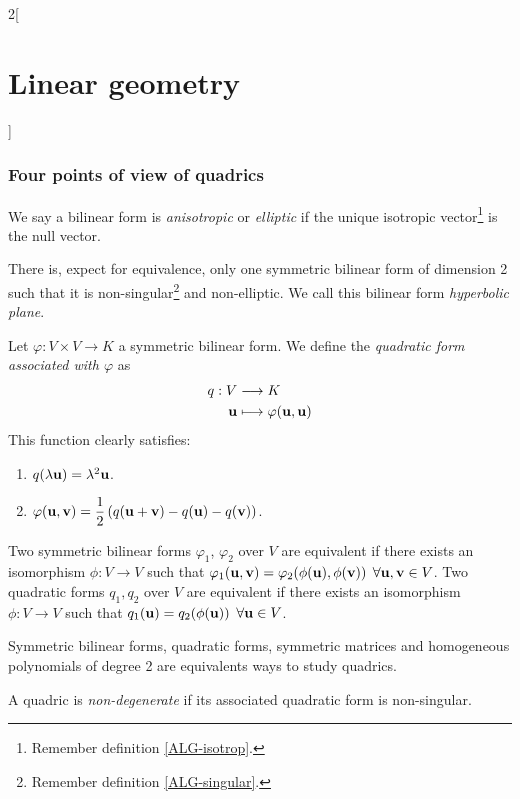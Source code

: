 \documentclass[../../../main.tex]{subfiles}
\begin{document}
\begin{multicols}{2}[\section{Linear geometry}]
    \subsubsection*{Four points of view of quadrics}
    \begin{definition}
        We say a bilinear form is \textit{anisotropic} or \textit{elliptic} if the unique isotropic vector\footnote{Remember definition \ref{ALG-isotrop}.} is the null vector.
    \end{definition}
    \begin{theorem}
        There is, expect for equivalence, only one symmetric bilinear form of dimension 2 such that it is non-singular\footnote{Remember definition \ref{ALG-singular}.} and non-elliptic. We call this bilinear form \textit{hyperbolic plane}.
    \end{theorem}
    \begin{definition}
        Let $\varphi:V\times V\rightarrow K$ a symmetric bilinear form. We define the \textit{quadratic form associated with $\varphi$} as
        \begin{align*}
            q:V                & \longrightarrow K                                         \\
            \boldsymbol{\mathrm{u}} & \longmapsto\varphi(\boldsymbol{\mathrm{u}},\boldsymbol{\mathrm{u}})
        \end{align*} This function clearly satisfies:
        \begin{enumerate}
            \item $q(\lambda\boldsymbol{\mathrm{u}})=\lambda^2\boldsymbol{\mathrm{u}}$.
            \item $\displaystyle\varphi(\boldsymbol{\mathrm{u}},\boldsymbol{\mathrm{v}})=\frac{1}{2}\left(q(\boldsymbol{\mathrm{u}}+\boldsymbol{\mathrm{v}})-q(\boldsymbol{\mathrm{u}})-q(\boldsymbol{\mathrm{v}})\right)$.
        \end{enumerate}
    \end{definition}
    \begin{prop}
        Two symmetric bilinear forms $\varphi_1$, $\varphi_2$ over $V$ are equivalent if there exists an isomorphism $\phi:V\rightarrow V$ such that $\varphi_1(\boldsymbol{\mathrm{u}},\boldsymbol{\mathrm{v}})=\varphi_2(\phi(\boldsymbol{\mathrm{u}}),\phi(\boldsymbol{\mathrm{v}}))$ $\forall\boldsymbol{\mathrm{u}},\boldsymbol{\mathrm{v}}\in V$.\newline
        Two quadratic forms $q_1,q_2$ over $V$ are equivalent if there exists an isomorphism $\phi:V\rightarrow V$ such that $q_1(\boldsymbol{\mathrm{u}})=q_2(\phi(\boldsymbol{\mathrm{u}}))$ $\forall\boldsymbol{\mathrm{u}}\in V$.
    \end{prop}
    \begin{theorem}
        Symmetric bilinear forms, quadratic forms, symmetric matrices and homogeneous polynomials of degree 2 are equivalents ways to study quadrics.
    \end{theorem}
    \begin{definition}
        A quadric is \textit{non-degenerate} if its associated quadratic form is non-singular.
    \end{definition}

\end{multicols}
\end{document}
